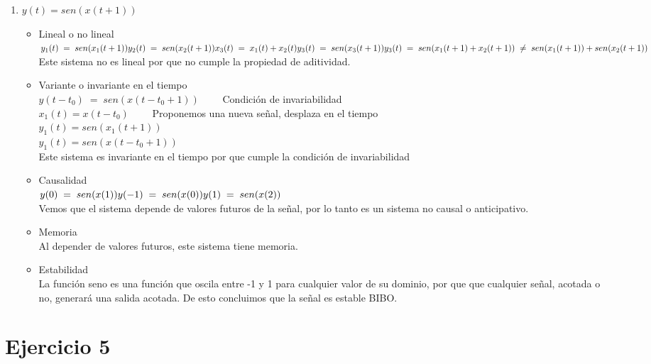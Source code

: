 \documentclass[10pt,a4paper]{report}
\begin{document}
\begin{enumerate}
  \item $y(t)=sen(x(t+1)) $
  \begin{itemize}
    \item Lineal o no lineal\\
$ y_1(t)\;=\;sen(x_1(t+1))\\
  y_2(t)\;=\;sen(x_2(t+1))\\
  x_3(t)\;=\;x_1(t)+x_2(t)\\
  y_3(t)\;=\;sen(x_3(t+1))\\
  y_3(t)\;=\;sen(x_1(t+1)+x_2(t+1))\;\neq\;sen(x_1(t+1))+sen(x_2(t+1))
$\\
  \newline Este sistema no es lineal por que no cumple la propiedad de aditividad.

  \item Variante o invariante en el tiempo\\
$ y(t-t_0)\;=\;sen(x(t-t_0+1)) \qquad $ Condición de invariabilidad\\
$ x_1(t)=x(t-t_0) \qquad $ Proponemos una nueva señal, desplaza en el tiempo \\ 
$ y_1(t)=sen(x_1(t+1)) $\\
$ y_1(t)=sen(x(t-t_0+1)) $\\
  \newline  
  Este sistema es invariante en el tiempo por que cumple la condición de invariabilidad\\
  \item Causalidad\\
$y(0)\;=\;sen(x(1))\\
y(-1)\;=\;sen(x(0))\\
y(1)\;=\;sen(x(2))$\\
  \newline
Vemos que el sistema depende de valores futuros de la señal, por lo tanto es un sistema no causal o anticipativo.
  \item Memoria\\
Al depender de valores futuros, este sistema tiene memoria.

  \item Estabilidad\\
La función seno es una función que oscila entre -1 y 1 para cualquier valor de su dominio, por que que cualquier señal, acotada o no, generará una salida acotada. De esto concluimos que la señal es estable BIBO.
  \end{itemize}
\end{enumerate}
\section{Ejercicio 5}
\end{document}
